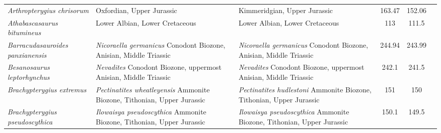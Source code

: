\begin{longtabu}{>{\itshape}lXXSSl}
	Arthropterygius chrisorum                            & Oxfordian, Upper Jurassic                                                                                                          & Kimmeridgian, Upper Jurassic                                                                                                       & 163.47                   & 152.06                   & \cite{Maxwell2010} \\                    
	Athabascasaurus bitumineus                           & Lower Albian, Lower Cretaceous                                                                                                     & Lower Albian, Lower Cretaceous                                                                                                     & 113                      & 111.5                    & \cite{Druckenmiller2010} \\              
	Barracudasauroides panxianensis                      & \emph{Nicoraella germanicus} Conodont Biozone, Anisian, Middle Triassic                                                            & \emph{Nicoraella germanicus} Conodont Biozone, Anisian, Middle Triassic                                                            & 244.94                   & 243.99                   & \cite{Jiang2006} \\                      
	Besanosaurus leptorhynchus                           & \emph{Nevadites} Conodont Biozone, uppermost Anisian, Middle Triassic                                                              & \emph{Nevadites} Conodont Biozone, uppermost Anisian, Middle Triassic                                                              & 242.1                    & 241.5                    & \cite{DalSasso1996} \\                   
	Brachypterygius extremus                             & \emph{Pectinatites wheatleyensis} Ammonite Biozone, Tithonian, Upper Jurassic                                                      & \emph{Pectinatites hudlestoni} Ammonite Biozone, Tithonian, Upper Jurassic                                                         & 151                      & 150                      & \cite{Moon2018} \\                       
	Brachypterygius pseudoscythica                       & \emph{Ilowaisya pseudoscythica} Ammonite Biozone, Tithonian, Upper Jurassic                                                        & \emph{Ilowaisya pseudoscythica} Ammonite Biozone, Tithonian, Upper Jurassic                                                        & 150.1                    & 149.5                    & \cite{Efimov1998} \\                     

\end{longtabu}
